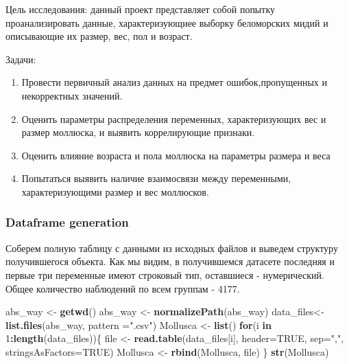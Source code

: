 \documentclass[]{article}
\newenvironment{Shaded}{\begin{snugshade}}{\end{snugshade}}
\newcommand{\ControlFlowTok}[1]{\textcolor[rgb]{0.13,0.29,0.53}{\textbf{#1}}}
\newcommand{\DataTypeTok}[1]{\textcolor[rgb]{0.13,0.29,0.53}{#1}}
\newcommand{\DecValTok}[1]{\textcolor[rgb]{0.00,0.00,0.81}{#1}}
\newcommand{\KeywordTok}[1]{\textcolor[rgb]{0.13,0.29,0.53}{\textbf{#1}}}
\newcommand{\NormalTok}[1]{#1}
\newcommand{\OperatorTok}[1]{\textcolor[rgb]{0.81,0.36,0.00}{\textbf{#1}}}
\newcommand{\OtherTok}[1]{\textcolor[rgb]{0.56,0.35,0.01}{#1}}
\newcommand{\StringTok}[1]{\textcolor[rgb]{0.31,0.60,0.02}{#1}}
\providecommand{\tightlist}{%
  \setlength{\itemsep}{0pt}\setlength{\parskip}{0pt}}
\begin{document}
Цель исследования: данный проект представляет собой попытку
проанализировать данные, характеризующиее выборку беломорских мидий и
описывающие их размер, вес, пол и возраст.

Задачи:

\begin{enumerate}
\def\labelenumi{\arabic{enumi}.}
\tightlist
\item
  Провести первичный анализ данных на предмет ошибок,пропущенных и
  некорректных значений.
\item
  Оценить параметры распределения переменных, характеризующих вес и
  размер моллюска, и выявить коррелирующие признаки.
\item
  Оценить влияние возраста и пола моллюска на параметры размера и веса
\item
  Попытаться выявить наличие взаимосвязи между переменными,
  характеризующими размер и вес моллюсков.
\end{enumerate}

\hypertarget{dataframe-generation}{%
\subsubsection{Dataframe generation}\label{dataframe-generation}}

Соберем полную таблицу с данными из исходных файлов и выведем структуру
получившегося объекта. Как мы видим, в получившемся датасете последняя и
первые три переменные имеют строковый тип, оставшиеся - нумерический.
Общее количество наблюдений по всем группам - 4177.

\begin{Shaded}
\begin{Highlighting}[]
\NormalTok{abs_way <-}\StringTok{ }\KeywordTok{getwd}\NormalTok{() }
\NormalTok{abs_way <-}\StringTok{ }\KeywordTok{normalizePath}\NormalTok{(abs_way)}
\NormalTok{data_files<-}\StringTok{ }\KeywordTok{list.files}\NormalTok{(abs_way, }\DataTypeTok{pattern =}\StringTok{".csv"}\NormalTok{)}
\NormalTok{Mollusca <-}\StringTok{ }\KeywordTok{list}\NormalTok{()}
\ControlFlowTok{for}\NormalTok{(i }\ControlFlowTok{in} \DecValTok{1}\OperatorTok{:}\KeywordTok{length}\NormalTok{(data_files))\{}
\NormalTok{file <-}\StringTok{ }\KeywordTok{read.table}\NormalTok{(data_files[i], }\DataTypeTok{header=}\OtherTok{TRUE}\NormalTok{, }\DataTypeTok{sep=}\StringTok{","}\NormalTok{, }\DataTypeTok{stringsAsFactors=}\OtherTok{TRUE}\NormalTok{)}
\NormalTok{Mollusca <-}\StringTok{ }\KeywordTok{rbind}\NormalTok{(Mollusca, file)}
\NormalTok{\}}
\KeywordTok{str}\NormalTok{(Mollusca)}
\end{Highlighting}
\end{Shaded}
\end{document}
